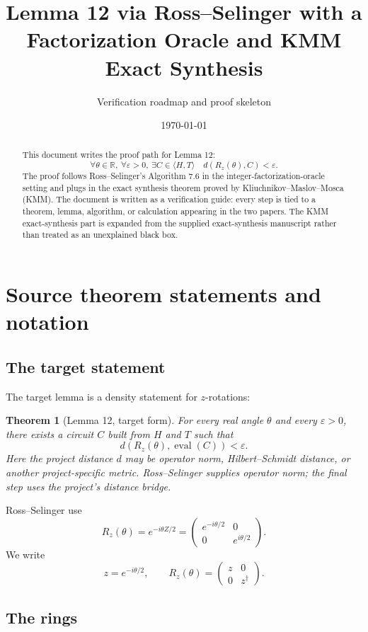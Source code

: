 \documentclass[11pt]{article}
\title{Lemma 12 via Ross--Selinger with a Factorization Oracle and KMM Exact Synthesis}
\author{Verification roadmap and proof skeleton}
\date{\today}
\newtheorem{theorem}{Theorem}[section]
\newcommand{\R}{\mathbb R}
\newcommand{\eps}{\varepsilon}
\newcommand{\mat}[1]{\begin{pmatrix}#1\end{pmatrix}}
\begin{document}
\maketitle

\begin{abstract}
This document writes the proof path for Lemma 12:
\[
  \forall \theta\in\R,\ \forall \eps>0,\ \exists C\in\langle H,T\rangle\quad
  d(R_z(\theta),C)<\eps.
\]
The proof follows Ross--Selinger's Algorithm 7.6 in the integer-factorization-oracle setting and plugs in the exact synthesis theorem proved by Kliuchnikov--Maslov--Mosca (KMM). The document is written as a verification guide: every step is tied to a theorem, lemma, algorithm, or calculation appearing in the two papers. The KMM exact-synthesis part is expanded from the supplied exact-synthesis manuscript rather than treated as an unexplained black box.
\end{abstract}

\tableofcontents

\section{Source theorem statements and notation}

\subsection{The target statement}

The target lemma is a density statement for $z$-rotations:
\begin{theorem}[Lemma 12, target form]
For every real angle $\theta$ and every $\eps>0$, there exists a circuit $C$ built from $H$ and $T$ such that
\[
  d(R_z(\theta),\operatorname{eval}(C))<\eps.
\]
Here the project distance $d$ may be operator norm, Hilbert--Schmidt distance, or another project-specific metric. Ross--Selinger supplies operator norm; the final step uses the project's distance bridge.
\end{theorem}

Ross--Selinger use
\[
  R_z(\theta)=e^{-i\theta Z/2}=
  \mat{e^{-i\theta/2} & 0\\ 0 & e^{i\theta/2}}.
\]
We write
\[
  z=e^{-i\theta/2},
  \qquad
  R_z(\theta)=\mat{z&0\\0&z^\dagger}.
\]

\subsection{The rings}
\end{document}
